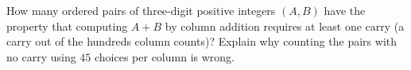 How many ordered pairs of three-digit positive integers $(A,B)$ have the property that computing $A+B$ by column addition requires at least one carry (a carry out of the hundreds column counts)? Explain why counting the pairs with no carry using $45$ choices per column is wrong.
